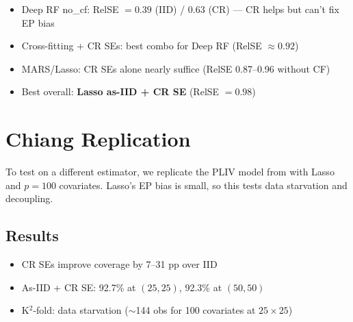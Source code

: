 \documentclass[11pt,a4paper]{article}
\begin{document}
\begin{table}[H]
\centering\small
\caption{Coverage and RelSE by strategy $\times$ SE type, Balkus Original DGP (averaged over $n = 400, 900, 2500$).}
\label{tab:decoupling}

\end{table}

\begin{itemize}[leftmargin=1.5em, nosep]
  \item Deep RF no\_cf: RelSE $= 0.39$ (IID) / $0.63$ (CR) --- CR helps but can't fix EP bias
  \item Cross-fitting + CR SEs: best combo for Deep RF (RelSE $\approx 0.92$)
  \item MARS/Lasso: CR SEs alone nearly suffice (RelSE 0.87--0.96 without CF)
  \item Best overall: \textbf{Lasso as-IID + CR SE} (RelSE $= 0.98$)
\end{itemize}


\section{Chiang Replication}
\label{sec:chiang}

To test on a different estimator, we replicate the PLIV model from \citet[Section~4.1]{chiang2021} with Lasso and $p = 100$ covariates. Lasso's EP bias is small, so this tests data starvation and decoupling.

\subsection{Results}

\begin{table}[H]
\centering\small
\caption{Chiang PLIV, 220 reps. As-IID + CR SE wins every scenario.}
\label{tab:chiang-decoupling}

\end{table}

\begin{itemize}[leftmargin=1.5em, nosep]
  \item CR SEs improve coverage by 7--31 pp over IID
  \item As-IID + CR SE: 92.7\% at $(25,25)$, 92.3\% at $(50,50)$
  \item K$^2$-fold: data starvation ($\sim$144 obs for 100 covariates at $25 \times 25$)
\end{itemize}
\end{document}
